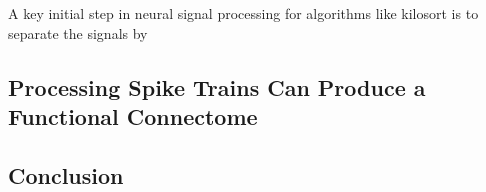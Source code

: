 \documentclass[11pt]{article}
\newcommand{\subsectionwithindent}[1]{
    \subsection*{#1}
    \hspace{\parindent} %
}
\begin{document}
A key initial step in neural signal processing for algorithms like kilosort is to separate the signals by





\subsectionwithindent{Processing Spike Trains Can Produce a Functional Connectome} %


\subsectionwithindent{Conclusion} %

\newpage
\printbibliography
\end{document}
